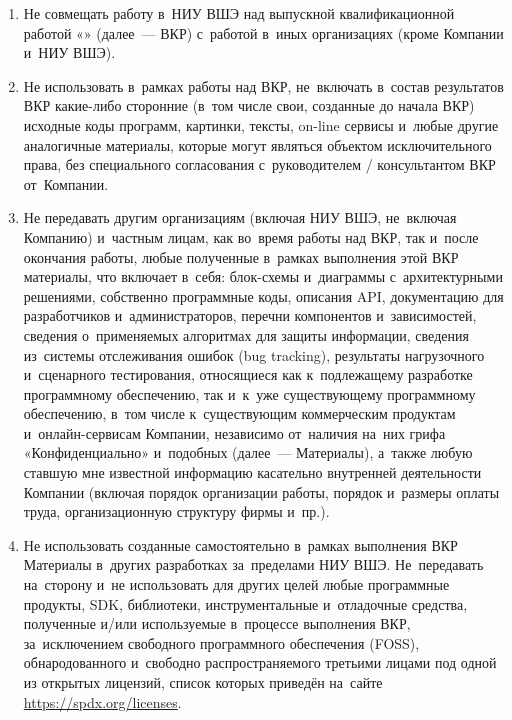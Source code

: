 \documentclass[12pt,a4paper]{extarticle}
\begin{document}
\begin{enumerate}[leftmargin=1.4em, itemsep=5pt]
  \item Не совмещать работу в~НИУ ВШЭ над выпускной квалификационной работой
        «\hseProjectName» (далее~--- ВКР) с~работой в~иных организациях (кроме
        Компании и~НИУ ВШЭ).

  \item Не использовать в~рамках работы над ВКР, не~включать в~состав
        результатов ВКР какие-либо сторонние (в~том числе свои, созданные до
        начала ВКР) исходные коды программ, картинки, тексты, on-line сервисы и~любые
        другие аналогичные материалы, которые могут являться объектом
        исключительного права, без специального согласования с~руководителем /
        консультантом ВКР от~Компании.

  \item Не передавать другим организациям (включая НИУ ВШЭ, не~включая Компанию)
        и~частным лицам, как во~время работы над ВКР, так и~после окончания
        работы, любые полученные в~рамках выполнения этой ВКР материалы, что
        включает в~себя: блок-схемы и~диаграммы с~архитектурными решениями,
        собственно программные коды, описания API, документацию для разработчиков
        и~администраторов, перечни компонентов и~зависимостей, сведения о~применяемых
        алгоритмах для защиты информации, сведения из~системы отслеживания ошибок
        (bug tracking), результаты нагрузочного и~сценарного тестирования,
        относящиеся как к~подлежащему разработке программному обеспечению, так и~к~уже
        существующему программному обеспечению, в~том числе к~существующим
        коммерческим продуктам и~онлайн-сервисам Компании, независимо от~наличия на~них
        грифа «Конфиденциально» и~подобных (далее~--- Материалы), а~также любую
        ставшую мне известной информацию касательно внутренней деятельности Компании
        (включая порядок организации работы, порядок и~размеры оплаты труда,
        организационную структуру фирмы и~пр.).

  \item Не использовать созданные самостоятельно в~рамках выполнения ВКР Материалы
        в~других разработках за~пределами НИУ ВШЭ. Не~передавать на~сторону и~не
        использовать для других целей любые программные продукты, SDK, библиотеки,
        инструментальные и~отладочные средства, полученные и/или используемые в~процессе
        выполнения ВКР, за~исключением свободного программного обеспечения (FOSS),
        обнародованного и~свободно распространяемого третьими лицами под одной из
        открытых лицензий, список которых приведён на~сайте
        \url{https://spdx.org/licenses}.


\end{enumerate}
\end{document}
